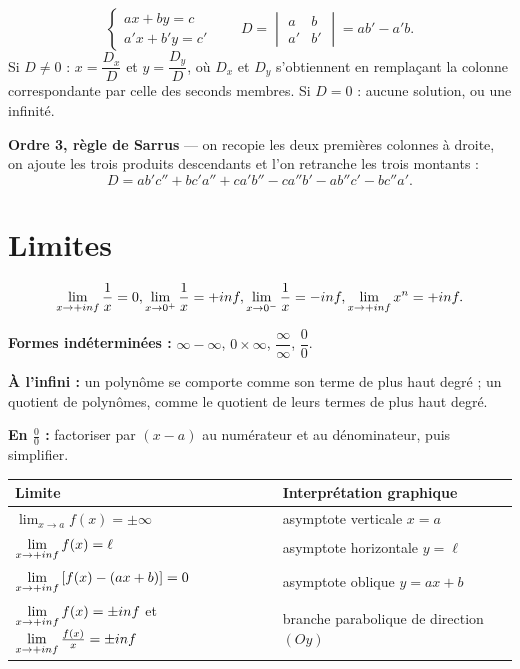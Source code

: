 \[
  \begin{cases} ax+by = c\\ a'x+b'y = c'\end{cases}
  \qquad
  D = \begin{vmatrix} a & b\\ a' & b'\end{vmatrix} = ab'-a'b .
\]
Si $D \neq 0$ : $x = \dfrac{D_{x}}{D}$ et $y = \dfrac{D_{y}}{D}$, où
$D_{x}$ et $D_{y}$ s'obtiennent en remplaçant la colonne correspondante par
celle des seconds membres. Si $D = 0$ : aucune solution, ou une infinité.

\textbf{Ordre 3, règle de Sarrus} — on recopie les deux premières colonnes à
droite, on ajoute les trois produits descendants et l'on retranche les trois
montants :
\[
  D = ab'c''+bc'a''+ca'b''-ca''b'-ab''c'-bc''a' .
\]

\section{Limites}

\[
  \limpinf \frac1x = 0, \quad
  \lim_{x\to0^{+}}\frac1x = +\infty, \quad
  \lim_{x\to0^{-}}\frac1x = -\infty, \quad
  \limpinf x^{n} = +\infty .
\]

\textbf{Formes indéterminées :} $\infty-\infty$, $0\times\infty$,
$\dfrac{\infty}{\infty}$, $\dfrac00$.

\textbf{À l'infini :} un polynôme se comporte comme son terme de plus haut
degré ; un quotient de polynômes, comme le quotient de leurs termes de plus
haut degré.

\textbf{En $\frac00$ :} factoriser par $(x-a)$ au numérateur et au
dénominateur, puis simplifier.

\begin{center}
\renewcommand{\arraystretch}{1.4}
\begin{tabular}{|L{5.4cm}|L{6.4cm}|}
\hline
\textbf{Limite} & \textbf{Interprétation graphique}\\
\hline
$\displaystyle\lim_{x\to a} f(x) = \pm\infty$ & asymptote verticale
$x = a$\\
$\limpinf f(x) = \ell$ & asymptote horizontale $y = \ell$\\
$\limpinf\left[f(x)-(ax+b)\right] = 0$ & asymptote oblique $y = ax+b$\\
$\limpinf f(x) = \pm\infty$ et $\limpinf\frac{f(x)}{x} = \pm\infty$ &
branche parabolique de direction $(Oy)$\\
\hline
\end{tabular}
\end{center}

